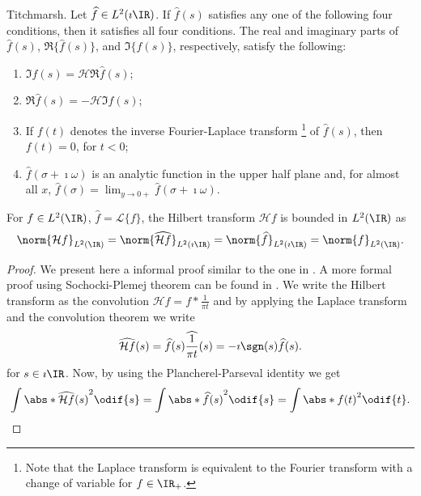 \begin{theorem}{Titchmarsh.} \label{th:Titchmarsh}
Let $\widehat{f} \in L^2(\imath\IR)$. If $\widehat{f}(s)$ satisfies any one of the following four conditions, then it satisfies all four conditions. The real and imaginary parts of $\widehat{f}(s)$, $\Re \{ \widehat{f}(s) \}$, and $\Im \{\widehat{f}(s)\}$, respectively, satisfy the following:
    \begin{enumerate} [label=(\roman*)]
    \itemsep0em 
    \item $\Im \widehat{f}(s) = \mathcal{H} \Re \widehat{f}(s)$;
    \item $\Re \widehat{f}(s) = -\mathcal{H} \Im \widehat{f}(s)$;
    \item If $f(t)$ denotes the inverse Fourier-Laplace transform \footnote{Note that the Laplace transform is equivalent to the Fourier transform with a change of variable for $f \in \IR_+$.} of $\widehat{f}(s)$, then $f(t)=0$, for $t<0$;
    \item $\widehat{f}(\sigma + \imath \omega)$ is an analytic function in the upper half plane and, for almost all $x$, $\widehat{f}(\sigma) = \lim_{y \rightarrow 0+} \widehat{f}(\sigma + \imath \omega)$.
    \end{enumerate} 
\end{theorem}

\begin{proposition}{} \label{prop:HL2}
    For $f \in L^2(\IR)$, $\widehat{f} = \mathcal{L} \{f\}$, the Hilbert transform $\mathcal{H}f$ is bounded in $L^2(\IR)$ as
    \begin{equation} \label{eq:norm-hilbert}
        \norm{\mathcal{H}f}_{L^2(\IR)} = \norm{\widehat{\mathcal{H}f}}_{L^2(\imath \IR)} = \norm{\widehat{f}}_{L^2(\imath \IR)} =\norm{f}_{L^2(\IR)}.
    \end{equation}
\end{proposition}

\begin{proof}
    We present here a informal proof similar to the one in \cite{taoLECTURENOTES247A}. A more formal proof using Sochocki-Plemej theorem can be found in \cite{taoLECTURENOTES247A,chaudhury_lp_2012}. We write the Hilbert transform as the convolution $\mathcal{H}f = f * \frac{1}{\pi t}$ and by applying the Laplace transform and the convolution theorem we write
    \begin{equation}
        \widehat{\mathcal{H}f} (s) = \widehat{f}(s) \widehat{\frac{1}{\pi t}}(s) =-\imath \sgn(s)\widehat{f}(s).
    \end{equation}
    for $s \in \imath \IR$.
    Now, by using the Plancherel-Parseval identity we get
    \begin{equation}
        \int \abs*{\widehat{\mathcal{H}f}(s)}^2\odif{s} = \int \abs*{\widehat{f}(s)}^2\odif{s} = \int \abs*{f(t)}^2\odif{t}.
    \end{equation}
\end{proof}

